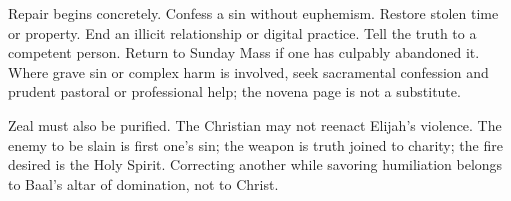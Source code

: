 Repair begins concretely. Confess a sin without euphemism. Restore stolen time or property. End an illicit relationship or digital practice. Tell the truth to a competent person. Return to Sunday Mass if one has culpably abandoned it. Where grave sin or complex harm is involved, seek sacramental confession and prudent pastoral or professional help; the novena page is not a substitute.

Zeal must also be purified. The Christian may not reenact Elijah's violence. The enemy to be slain is first one's sin; the weapon is truth joined to charity; the fire desired is the Holy Spirit. Correcting another while savoring humiliation belongs to Baal's altar of domination, not to Christ.




